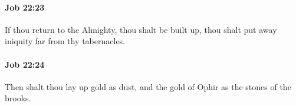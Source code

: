 		\paragraph{Job 22:23} %
			\label{JOB-22-23}

			If thou return to the Almighty, thou shalt be built up, thou shalt put away iniquity far from thy tabernacles.


		\paragraph{Job 22:24} %
			\label{JOB-22-24}

			Then shalt thou lay up gold as dust, and the gold of Ophir as the stones of the brooks.


